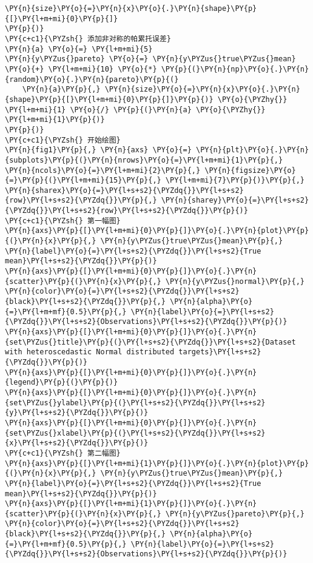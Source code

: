 \begin{Verbatim}[commandchars=\\\{\}]
    \PY{n}{size}\PY{o}{=}\PY{n}{x}\PY{o}{.}\PY{n}{shape}\PY{p}{[}\PY{l+m+mi}{0}\PY{p}{]}
\PY{p}{)}
\PY{c+c1}{\PYZsh{} 添加非对称的帕累托误差}
\PY{n}{a} \PY{o}{=} \PY{l+m+mi}{5}
\PY{n}{y\PYZus{}pareto} \PY{o}{=} \PY{n}{y\PYZus{}true\PYZus{}mean} \PY{o}{+} \PY{l+m+mi}{10} \PY{o}{*} \PY{p}{(}\PY{n}{np}\PY{o}{.}\PY{n}{random}\PY{o}{.}\PY{n}{pareto}\PY{p}{(}
    \PY{n}{a}\PY{p}{,} \PY{n}{size}\PY{o}{=}\PY{n}{x}\PY{o}{.}\PY{n}{shape}\PY{p}{[}\PY{l+m+mi}{0}\PY{p}{]}\PY{p}{)} \PY{o}{\PYZhy{}} \PY{l+m+mi}{1} \PY{o}{/} \PY{p}{(}\PY{n}{a} \PY{o}{\PYZhy{}} \PY{l+m+mi}{1}\PY{p}{)}
\PY{p}{)}
\PY{c+c1}{\PYZsh{} 开始绘图}
\PY{n}{fig1}\PY{p}{,} \PY{n}{axs} \PY{o}{=} \PY{n}{plt}\PY{o}{.}\PY{n}{subplots}\PY{p}{(}\PY{n}{nrows}\PY{o}{=}\PY{l+m+mi}{1}\PY{p}{,} \PY{n}{ncols}\PY{o}{=}\PY{l+m+mi}{2}\PY{p}{,} \PY{n}{figsize}\PY{o}{=}\PY{p}{(}\PY{l+m+mi}{15}\PY{p}{,} \PY{l+m+mi}{7}\PY{p}{)}\PY{p}{,} \PY{n}{sharex}\PY{o}{=}\PY{l+s+s2}{\PYZdq{}}\PY{l+s+s2}{row}\PY{l+s+s2}{\PYZdq{}}\PY{p}{,} \PY{n}{sharey}\PY{o}{=}\PY{l+s+s2}{\PYZdq{}}\PY{l+s+s2}{row}\PY{l+s+s2}{\PYZdq{}}\PY{p}{)}
\PY{c+c1}{\PYZsh{} 第一幅图}
\PY{n}{axs}\PY{p}{[}\PY{l+m+mi}{0}\PY{p}{]}\PY{o}{.}\PY{n}{plot}\PY{p}{(}\PY{n}{x}\PY{p}{,} \PY{n}{y\PYZus{}true\PYZus{}mean}\PY{p}{,} \PY{n}{label}\PY{o}{=}\PY{l+s+s2}{\PYZdq{}}\PY{l+s+s2}{True mean}\PY{l+s+s2}{\PYZdq{}}\PY{p}{)}
\PY{n}{axs}\PY{p}{[}\PY{l+m+mi}{0}\PY{p}{]}\PY{o}{.}\PY{n}{scatter}\PY{p}{(}\PY{n}{x}\PY{p}{,} \PY{n}{y\PYZus{}normal}\PY{p}{,} \PY{n}{color}\PY{o}{=}\PY{l+s+s2}{\PYZdq{}}\PY{l+s+s2}{black}\PY{l+s+s2}{\PYZdq{}}\PY{p}{,} \PY{n}{alpha}\PY{o}{=}\PY{l+m+mf}{0.5}\PY{p}{,} \PY{n}{label}\PY{o}{=}\PY{l+s+s2}{\PYZdq{}}\PY{l+s+s2}{Observations}\PY{l+s+s2}{\PYZdq{}}\PY{p}{)}
\PY{n}{axs}\PY{p}{[}\PY{l+m+mi}{0}\PY{p}{]}\PY{o}{.}\PY{n}{set\PYZus{}title}\PY{p}{(}\PY{l+s+s2}{\PYZdq{}}\PY{l+s+s2}{Dataset with heteroscedastic Normal distributed targets}\PY{l+s+s2}{\PYZdq{}}\PY{p}{)}
\PY{n}{axs}\PY{p}{[}\PY{l+m+mi}{0}\PY{p}{]}\PY{o}{.}\PY{n}{legend}\PY{p}{(}\PY{p}{)}
\PY{n}{axs}\PY{p}{[}\PY{l+m+mi}{0}\PY{p}{]}\PY{o}{.}\PY{n}{set\PYZus{}ylabel}\PY{p}{(}\PY{l+s+s2}{\PYZdq{}}\PY{l+s+s2}{y}\PY{l+s+s2}{\PYZdq{}}\PY{p}{)}
\PY{n}{axs}\PY{p}{[}\PY{l+m+mi}{0}\PY{p}{]}\PY{o}{.}\PY{n}{set\PYZus{}xlabel}\PY{p}{(}\PY{l+s+s2}{\PYZdq{}}\PY{l+s+s2}{x}\PY{l+s+s2}{\PYZdq{}}\PY{p}{)}
\PY{c+c1}{\PYZsh{} 第二幅图}
\PY{n}{axs}\PY{p}{[}\PY{l+m+mi}{1}\PY{p}{]}\PY{o}{.}\PY{n}{plot}\PY{p}{(}\PY{n}{x}\PY{p}{,} \PY{n}{y\PYZus{}true\PYZus{}mean}\PY{p}{,} \PY{n}{label}\PY{o}{=}\PY{l+s+s2}{\PYZdq{}}\PY{l+s+s2}{True mean}\PY{l+s+s2}{\PYZdq{}}\PY{p}{)}
\PY{n}{axs}\PY{p}{[}\PY{l+m+mi}{1}\PY{p}{]}\PY{o}{.}\PY{n}{scatter}\PY{p}{(}\PY{n}{x}\PY{p}{,} \PY{n}{y\PYZus{}pareto}\PY{p}{,} \PY{n}{color}\PY{o}{=}\PY{l+s+s2}{\PYZdq{}}\PY{l+s+s2}{black}\PY{l+s+s2}{\PYZdq{}}\PY{p}{,} \PY{n}{alpha}\PY{o}{=}\PY{l+m+mf}{0.5}\PY{p}{,} \PY{n}{label}\PY{o}{=}\PY{l+s+s2}{\PYZdq{}}\PY{l+s+s2}{Observations}\PY{l+s+s2}{\PYZdq{}}\PY{p}{)}

\end{Verbatim}
